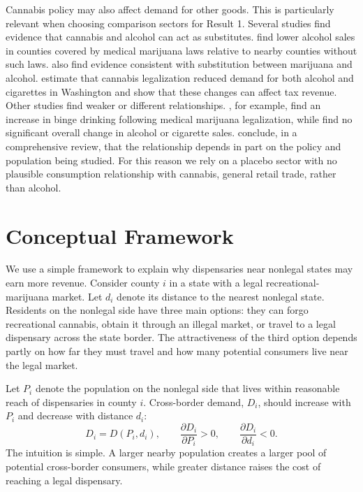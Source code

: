 \documentclass[12pt]{article}
\begin{document}
Cannabis policy may also affect demand for other goods. This is particularly relevant when choosing
comparison sectors for Result 1. Several studies find evidence that cannabis and alcohol can act as
substitutes. \citet{BaggioChongKwon2020} find lower alcohol sales in counties covered by medical marijuana
laws relative to nearby counties without such laws. \citet{AndersonHansenRees2013} also find evidence
consistent with substitution between marijuana and alcohol. \citet{MillerSeo2021} estimate that cannabis
legalization reduced demand for both alcohol and cigarettes in Washington and show that these changes can
affect tax revenue. Other studies find weaker or different relationships. \citet{WenHockenberryCummings2015},
for example, find an increase in binge drinking following medical marijuana legalization, while
\citet{Veligati2020} find no significant overall change in alcohol or cigarette sales.
\citet{AndersonRees2023} conclude, in a comprehensive review, that the relationship depends in part on the
policy and population being studied. For this reason we rely on a placebo sector with no plausible
consumption relationship with cannabis, general retail trade, rather than alcohol.

\section{Conceptual Framework}

We use a simple framework to explain why dispensaries near nonlegal states may earn more revenue. Consider
county $i$ in a state with a legal recreational-marijuana market. Let $d_i$ denote its distance to the
nearest nonlegal state. Residents on the nonlegal side have three main options: they can forgo recreational
cannabis, obtain it through an illegal market, or travel to a legal dispensary across the state border. The
attractiveness of the third option depends partly on how far they must travel and how many potential
consumers live near the legal market.

Let $P_i$ denote the population on the nonlegal side that lives within reasonable reach of dispensaries in
county $i$. Cross-border demand, $D_i$, should increase with $P_i$ and decrease with distance $d_i$:
\begin{equation}
D_i = D(P_i,d_i),
\qquad
\frac{\partial D_i}{\partial P_i} > 0,
\qquad
\frac{\partial D_i}{\partial d_i} < 0.
\end{equation}
The intuition is simple. A larger nearby population creates a larger pool of potential cross-border
consumers, while greater distance raises the cost of reaching a legal dispensary.
\end{document}
